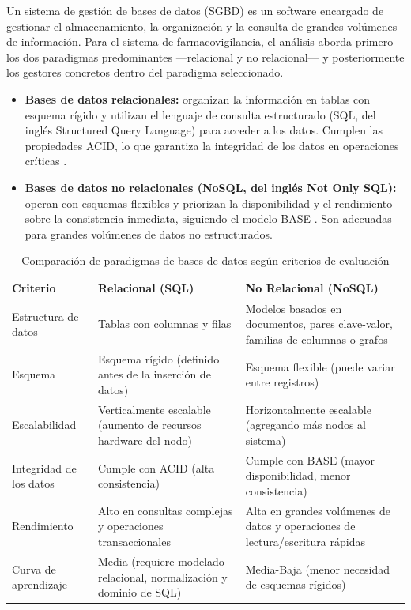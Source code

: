 Un sistema de gestión de bases de datos (SGBD) es un software encargado de gestionar el almacenamiento, la organización y la consulta de grandes volúmenes de información. 
Para el sistema de farmacovigilancia, el análisis aborda primero los dos paradigmas predominantes —relacional y no relacional— y posteriormente los gestores concretos dentro del paradigma seleccionado.

\begin{itemize}
\item \textbf{Bases de datos relacionales:} organizan la información en tablas con esquema rígido y utilizan el lenguaje de consulta estructurado (SQL, del inglés Structured Query Language) para acceder a los datos. Cumplen las propiedades ACID, lo que garantiza la integridad de los datos en operaciones críticas \cite{elmasri2016fundamentals}.
\item \textbf{Bases de datos no relacionales (NoSQL, del inglés Not Only SQL):} operan con esquemas flexibles y priorizan la disponibilidad y el rendimiento sobre la consistencia inmediata, siguiendo el modelo BASE \cite{moniruzzaman2013nosql}. Son adecuadas para grandes volúmenes de datos no estructurados.
\end{itemize}


\begin{table}[htbp]
	\centering
	\caption{Comparación de paradigmas de bases de datos según criterios de evaluación}
	\label{tab:comparacion_db}
	\renewcommand{\arraystretch}{1.3}
	\begin{tabular}{|p{3.2cm}|p{6.0cm}|p{6.0cm}|}
		\hline
	\textbf{Criterio} & \textbf{Relacional (SQL)} & \textbf{No Relacional (NoSQL)} \\[4pt]
	\hline
		Estructura de datos & Tablas con columnas y filas & Modelos basados en documentos, pares clave-valor, familias de columnas o grafos \\ \hline
		Esquema & Esquema rígido (definido antes de la inserción de datos) \cite{elmasri2016fundamentals} & Esquema flexible (puede variar entre registros) \cite{moniruzzaman2013nosql} \\ \hline
		Escalabilidad & Verticalmente escalable (aumento de recursos hardware del nodo) & Horizontalmente escalable (agregando más nodos al sistema) \\ \hline
		Integridad de los datos & Cumple con ACID (alta consistencia) \cite{ibm_acid_properties} & Cumple con BASE (mayor disponibilidad, menor consistencia) \cite{ibm_cap_theorem} \\ \hline
		Rendimiento & Alto en consultas complejas y operaciones transaccionales & Alta en grandes volúmenes de datos y operaciones de lectura/escritura rápidas \\ \hline
		Curva de aprendizaje & Media (requiere modelado relacional, normalización y dominio de SQL) & Media-Baja (menor necesidad de esquemas rígidos) \\ \hline
	\end{tabular}
\end{table}

